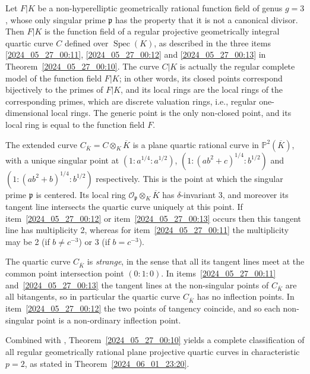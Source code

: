 \documentclass[12pt,reqno]{amsart}
\theoremstyle{definition}
\newcommand{\ov}{\overline}
\newcommand{\PP}{\mathbb{P}}
\newcommand{\OO}{\mathcal{O}}
\newcommand{\pp}{\mathfrak{p}}
\DeclareMathOperator{\Spec}{Spec}%
\begin{document}
Let $F|K$ be a non-hyperelliptic geometrically rational function field of genus $g=3$, whose only singular prime $\pp$ has the property that it is not a canonical divisor.
Then $F|K$ is the function field of a regular projective geometrically integral quartic curve $C$ defined over $\Spec(K)$, as described in the three items \ref{2024_05_27_00:11}, \ref{2024_05_27_00:12} and \ref{2024_05_27_00:13} in Theorem~\ref{2024_05_27_00:10}.
The curve $C|K$ is actually the regular complete model of the function field $F|K$; in other words, its closed points correspond bijectively to the primes of $F|K$, and its local rings are the local rings of the corresponding primes, which are discrete valuation rings, i.e., regular one-dimensional local rings.
The generic point is the only non-closed point, and its local ring is equal to the function field $F$.


The extended curve $C_{\ov K} = C \otimes_K \ov K$ is a plane quartic rational curve in $\PP^2 (\ov K)$, with a unique singular point at $(1:a^{1/4}:a^{1/2})$, $(1:(a b^2 + c)^{1/4} : b^{1/2})$ and $(1:(a b^2 + b)^{1/4}:b^{1/2})$ respectively.
This is the point at which the singular prime $\pp$ is centered.
Its local ring $\OO_\pp \otimes_K \ov K$ has $\delta$-invariant 3, and 
moreover its tangent line intersects the quartic curve uniquely at this point.
If item~\ref{2024_05_27_00:12} or item~\ref{2024_05_27_00:13} occurs then this tangent line has multiplicity 2, whereas for item~\ref{2024_05_27_00:11} the multiplicity may be 2 (if $b\neq c^{-3}$) or 3 (if $b = c^{-3}$).

The quartic curve $C_{\ov K}$ is \emph{strange}, in the sense that all its tangent lines meet at the common point intersection point $(0:1:0)$.
In items~\ref{2024_05_27_00:11} and~\ref{2024_05_27_00:13} the tangent lines at the non-singular points of $C_{\ov K}$ are all bitangents, so in particular the quartic curve $C_{\ov K}$ has no inflection points.
In item~\ref{2024_05_27_00:12} the two points of tangency coincide, and so each non-singular point is a non-ordinary inflection point. 





\medskip 

Combined with \cite[Theorem~1.1]{HiSt23}, Theorem~\ref{2024_05_27_00:10} yields a complete classification of all regular geometrically rational plane projective quartic curves in characteristic $p=2$, as stated in Theorem~\ref{2024_06_01_23:20}.
\end{document}
